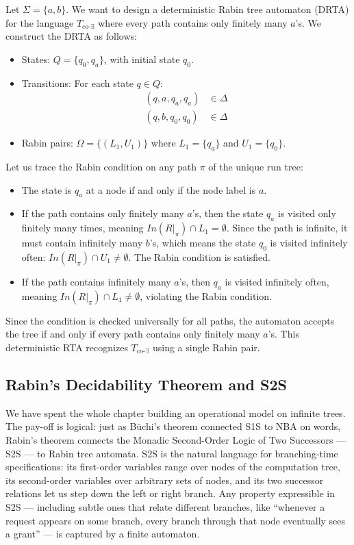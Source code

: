 \begin{example}
Let $\Sigma = \{a, b\}$. We want to design a deterministic Rabin tree automaton (DRTA) for the language $T_{co\text{-}\exists}$ where every path contains only finitely many $a$'s.
We construct the DRTA as follows:
\begin{itemize}
    \item States: $Q = \{q_0, q_a\}$, with initial state $q_0$.
    \item Transitions: For each state $q \in Q$:
    \begin{align*}
        (q, a, q_a, q_a) &\in \Delta \\
        (q, b, q_0, q_0) &\in \Delta
    \end{align*}
    \item Rabin pairs: $\Omega = \{ (L_1, U_1) \}$ where $L_1 = \{q_a\}$ and $U_1 = \{q_0\}$.
\end{itemize}
Let us trace the Rabin condition on any path $\pi$ of the unique run tree:
\begin{itemize}
    \item The state is $q_a$ at a node if and only if the node label is $a$.
    \item If the path contains only finitely many $a$'s, then the state $q_a$ is visited only finitely many times, meaning $In(R|_\pi) \cap L_1 = \emptyset$. Since the path is infinite, it must contain infinitely many $b$'s, which means the state $q_0$ is visited infinitely often: $In(R|_\pi) \cap U_1 \neq \emptyset$. The Rabin condition is satisfied.
    \item If the path contains infinitely many $a$'s, then $q_a$ is visited infinitely often, meaning $In(R|_\pi) \cap L_1 \neq \emptyset$, violating the Rabin condition.
\end{itemize}
Since the condition is checked universally for all paths, the automaton accepts the tree if and only if every path contains only finitely many $a$'s. This deterministic RTA recognizes $T_{co\text{-}\exists}$ using a single Rabin pair.
\end{example}

\subsection{Rabin's Decidability Theorem and S2S}
We have spent the whole chapter building an operational model on infinite trees. The pay-off is logical: just as Büchi's theorem connected S1S to NBA on words, Rabin's theorem connects the Monadic Second-Order Logic of Two Successors --- S2S --- to Rabin tree automata. S2S is the natural language for branching-time specifications: its first-order variables range over nodes of the computation tree, its second-order variables over arbitrary sets of nodes, and its two successor relations let us step down the left or right branch. Any property expressible in S2S --- including subtle ones that relate different branches, like ``whenever a request appears on some branch, every branch through that node eventually sees a grant'' --- is captured by a finite automaton.

